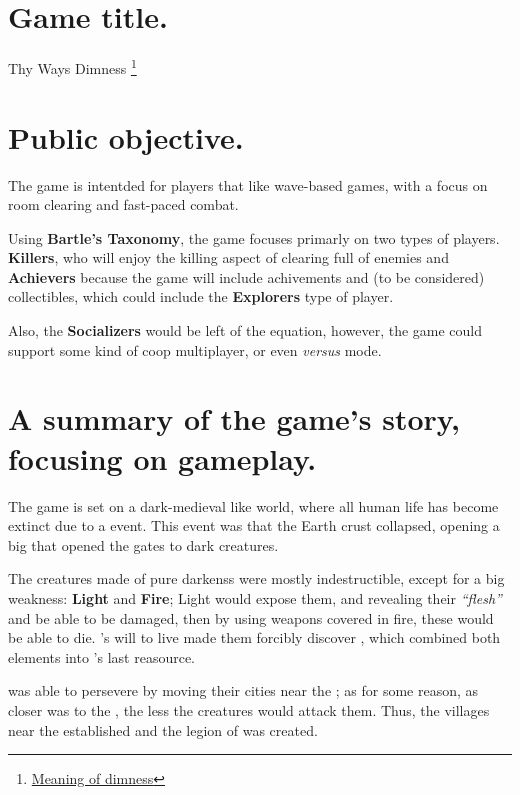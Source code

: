 \section{Game title.}
Thy Ways Dimness \footnote{\href{https://dictionary.cambridge.org/es/diccionario/ingles/dimness}{Meaning of dimness}}


\section{Public objective.}
The game is intentded for players that like wave-based games, with a focus on room clearing and fast-paced combat.

Using \textbf{Bartle's Taxonomy}, the game focuses primarly on two types of players. \textbf{Killers}, who will enjoy the killing aspect of clearing full of enemies and \textbf{Achievers} because the game will include achivements and (to be considered) collectibles, which could include the \textbf{Explorers} type of player.

Also, the \textbf{Socializers} would be left of the equation, however, the game could support some kind of coop multiplayer, or even \textit{versus} mode.



\section{A summary of the game's story, focusing on gameplay.}
The game is set on a dark-medieval like world, where all human life has become extinct due to a event. This event was that the Earth crust collapsed, opening a big \hole that opened the gates to dark creatures.

The creatures made of pure darkenss were mostly indestructible, except for a big weakness: \textbf{Light} and \textbf{Fire}; Light would expose them, and revealing their \textit{“flesh”} and be able to be damaged, then by using weapons covered in fire, these would be able to die. \humanity's will to live made them forcibly discover \gunpowder, which combined both elements into \humanity's last reasource.

\humanity was able to persevere by moving their cities near the \hole; as for some reason, as closer \humanity was to the \hole, the less the creatures would attack them. Thus, the villages near the \hole established and the legion of \hunters was created.

